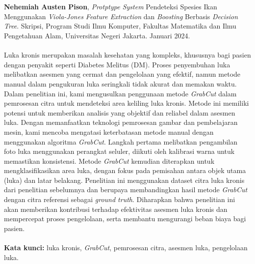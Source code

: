 \chapter*{}
\singlespacing{}

\textbf{Nehemiah Austen Pison}, \textit{Protptype System} Pendeteksi Spesies Ikan 
Menggunakan \textit{Viola-Jones Feature Extraction} dan \textit{Boosting} Berbasis 
\textit{Decision Tree}. Skripsi, Program Studi Ilmu Komputer, Fakultas Matematika dan Ilmu Pengetahuan Alam, Universitas Negeri Jakarta. Januari 2024.
\\
\\


Luka kronis merupakan masalah kesehatan yang kompleks, khususnya bagi pasien dengan 
penyakit seperti Diabetes Melitus (DM). Proses penyembuhan luka melibatkan asesmen 
yang cermat dan pengelolaan yang efektif, namun metode manual dalam pengukuran 
luka seringkali tidak akurat dan memakan waktu. Dalam penelitian ini, kami mengusulkan 
penggunaan metode \emph{GrabCut} dalam pemrosesan citra untuk mendeteksi area keliling 
luka kronis. Metode ini memiliki potensi untuk memberikan analisis yang objektif 
dan reliabel dalam asesmen luka. Dengan memanfaatkan teknologi pemrosesan gambar dan pembelajaran mesin, kami mencoba 
mengatasi keterbatasan metode manual dengan menggunakan algoritma \emph{GrabCut}. Langkah 
pertama melibatkan pengambilan foto luka menggunakan perangkat seluler, diikuti 
oleh kalibrasi warna untuk memastikan konsistensi. Metode \emph{GrabCut} kemudian diterapkan 
untuk mengklasifikasikan area luka, dengan fokus pada pemisahan antara objek utama 
(luka) dan latar belakang. Penelitian ini menggunakan dataset citra luka kronis dari penelitian sebelumnya 
dan berupaya membandingkan hasil metode \emph{GrabCut} dengan citra referensi sebagai 
\emph{ground truth}. Diharapkan bahwa penelitian ini akan memberikan kontribusi 
terhadap efektivitas asesmen luka kronis dan mempercepat proses pengelolaan, serta 
membantu mengurangi beban biaya bagi pasien.
\\
\\
\textbf{Kata kunci:} luka kronis, \emph{GrabCut}, pemrosesan citra, asesmen luka, pengelolaan luka.
